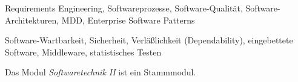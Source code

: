 \begin{module}
\begin{content}
Requirements Engineering, Softwareprozesse, Software-Qualität, Software-Architekturen, MDD, Enterprise Software Patterns

 

Software-Wartbarkeit, Sicherheit, Verläßlichkeit (Dependability), eingebettete Software, Middleware, statistisches Testen


\end{content}

\begin{remarks}Das Modul \emph{Softwaretechnik II} ist ein Stammmodul.

\end{remarks}

\end{module}

